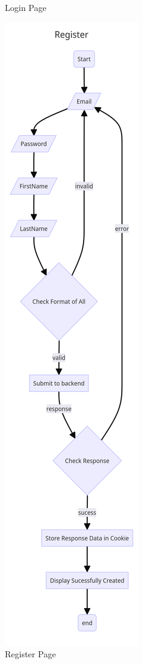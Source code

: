 \begin{figure}[H]
\begin{minipage}{0.48\textwidth}
        \caption{Login Page}
    \end{minipage}\hfill
    \begin{minipage}{0.48\textwidth}
        \centering
        \includegraphics[width=\textwidth,height=0.8\textheight,keepaspectratio]{Assets/registerPageFlow.png}
        \caption{Register Page}
    \end{minipage}
\end{figure}


